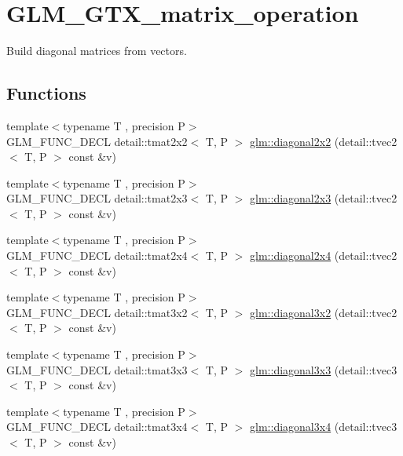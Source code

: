 \hypertarget{group__gtx__matrix__operation}{}\section{G\+L\+M\+\_\+\+G\+T\+X\+\_\+matrix\+\_\+operation}
\label{group__gtx__matrix__operation}


Build diagonal matrices from vectors.  


\subsection*{Functions}
\begin{DoxyCompactItemize}
\item 
{\footnotesize template$<$typename T , precision P$>$ }\\G\+L\+M\+\_\+\+F\+U\+N\+C\+\_\+\+D\+E\+CL detail\+::tmat2x2$<$ T, P $>$ \hyperlink{group__gtx__matrix__operation_gae4177a43a89e6b4b7352f82198f2ea84}{glm\+::diagonal2x2} (detail\+::tvec2$<$ T, P $>$ const \&v)
\item 
{\footnotesize template$<$typename T , precision P$>$ }\\G\+L\+M\+\_\+\+F\+U\+N\+C\+\_\+\+D\+E\+CL detail\+::tmat2x3$<$ T, P $>$ \hyperlink{group__gtx__matrix__operation_ga873468c41cb29fb84a12a866549e0136}{glm\+::diagonal2x3} (detail\+::tvec2$<$ T, P $>$ const \&v)
\item 
{\footnotesize template$<$typename T , precision P$>$ }\\G\+L\+M\+\_\+\+F\+U\+N\+C\+\_\+\+D\+E\+CL detail\+::tmat2x4$<$ T, P $>$ \hyperlink{group__gtx__matrix__operation_gaf97e094855cc3c6186b879d045f67aca}{glm\+::diagonal2x4} (detail\+::tvec2$<$ T, P $>$ const \&v)
\item 
{\footnotesize template$<$typename T , precision P$>$ }\\G\+L\+M\+\_\+\+F\+U\+N\+C\+\_\+\+D\+E\+CL detail\+::tmat3x2$<$ T, P $>$ \hyperlink{group__gtx__matrix__operation_gabf8e8445e2884aeaa35f0ec32ba5bd01}{glm\+::diagonal3x2} (detail\+::tvec2$<$ T, P $>$ const \&v)
\item 
{\footnotesize template$<$typename T , precision P$>$ }\\G\+L\+M\+\_\+\+F\+U\+N\+C\+\_\+\+D\+E\+CL detail\+::tmat3x3$<$ T, P $>$ \hyperlink{group__gtx__matrix__operation_gaa49be0f424ad2f3015c5945c13a5fad0}{glm\+::diagonal3x3} (detail\+::tvec3$<$ T, P $>$ const \&v)
\item 
{\footnotesize template$<$typename T , precision P$>$ }\\G\+L\+M\+\_\+\+F\+U\+N\+C\+\_\+\+D\+E\+CL detail\+::tmat3x4$<$ T, P $>$ \hyperlink{group__gtx__matrix__operation_gab96c533557a191bd972300868f8111ef}{glm\+::diagonal3x4} (detail\+::tvec3$<$ T, P $>$ const \&v)

\end{DoxyCompactItemize}
